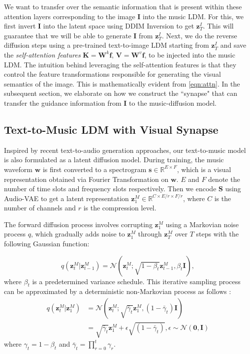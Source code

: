 We want to transfer over the semantic information that is present within these attention layers corresponding to the image $\bm{I}$ into the music LDM. For this, we first invert $\bm{I}$ into the latent space using DDIM Inversion \cite{song2020denoising} to get $\bm{z}^{I}_{T}$. This will guarantee that we will be able to generate $\bm{I}$ from $\bm{z}^{I}_{T}$. Next, we do the reverse diffusion steps using a pre-trained text-to-image LDM starting from $\bm{z}^{I}_{T}$ and save the \textit{self-attention features} $\bm{K} = \bm{W}^k \bm{f}$, $\bm{V} = \bm{W}^v \bm{f}$, to be injected into the music LDM. The intuition behind leveraging the self-attention features is that they control the feature transformations responsible for generating the visual semantics of the image. This is mathematically evident from \cref{eqn:attn}. 
In the subsequent section, we elaborate on how we construct the ``synapse" that can transfer the guidance information from $\bm{I}$ to the music-diffusion model.

\subsection{Text-to-Music LDM with Visual Synapse}\label{sec:visual_synapse}
Inspired by recent text-to-audio \cite{audioldm,tango} generation approaches, our text-to-music model is also formulated as a latent diffusion model. During training, the music waveform $\bm{w}$ is first converted to a spectrogram $\bm{s} \in 
\mathbb{R}^{E \times F}$, which is a visual representation obtained via Fourier Transformation on $\bm{w}$. $E$ and $F$ denote the number of time slots and frequency slots respectively. Then we encode $\bm{S}$ using Audio-VAE \cite{audioldm} to get a latent representation $\bm{z}_1^M \in \mathbb{R}^{C \times E/r \times F/r}$, where $C$ is the number of channels and $r$ is the compression level.

The forward diffusion process involves corrupting $\bm{z}_1^M$ using a Markovian noise process $q$, which gradually adds noise to $\bm{z}_1^M$ through $\bm{z}_T^M$ over $T$ steps with the following Gaussian function:

\vspace{-0.11in}

\begin{equation}
    q(\bm{z}_{t}^M | \bm{z}_{t-1}^M) = \mathcal{N}(\bm{z}_t^M; \sqrt{1 - \beta_t}\bm{z}_{t-1}^M, \beta_t 
\textbf{I}),
\end{equation}
where $\beta_t$ is a predetermined variance schedule. This iterative sampling process can be approximated by a deterministic non-Markovian process as follows \cite{song2020denoising}:
\begin{align} 
q(\bm{z}_{t}^{M} | \bm{z}_{1}^{M}) &=  \mathcal{N}(\bm{z}_{t}^{M}; \sqrt{\bar{\gamma}_t}\bm{z}_{1}^{M}, (1 - \bar{\gamma}_t) \textbf{I}) \\ 
 &=  \sqrt{\bar{\gamma}_t}\bm{z}_{1}^{M} + \epsilon \sqrt{(1 - \bar{\gamma}_t)}, \epsilon \sim \mathcal{N}(\boldsymbol{0}, \textbf{I}) \label{eqn:noise}
\end{align}
where $\gamma_t = 1 - \beta_t$ and $\bar{\gamma}_t = \prod_{r=0}^t \gamma_r$.


